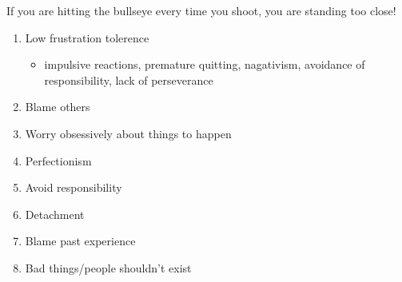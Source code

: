 \documentclass[12pt,]{krantz}
\providecommand{\tightlist}{%
  \setlength{\itemsep}{0pt}\setlength{\parskip}{0pt}}
\renewenvironment{quote}{\begin{VF}}{\end{VF}}
\begin{document}
\begin{quote}
If you are hitting the bullseye every time you shoot, you are standing
too close!
\end{quote}

\begin{enumerate}
\def\labelenumi{(\arabic{enumi})}
\setcounter{enumi}{2}
\item
  Low frustration tolerence

  \begin{itemize}
  \tightlist
  \item
    impulsive reactions, premature quitting, nagativism, avoidance of
    responsibility, lack of perseverance
  \end{itemize}
\item
  Blame others
\item
  Worry obsessively about things to happen
\item
  Perfectionism
\item
  Avoid responsibility
\item
  Detachment
\item
  Blame past experience
\item
  Bad things/people shouldn't exist
\end{enumerate}



\backmatter
\printindex
\end{document}
